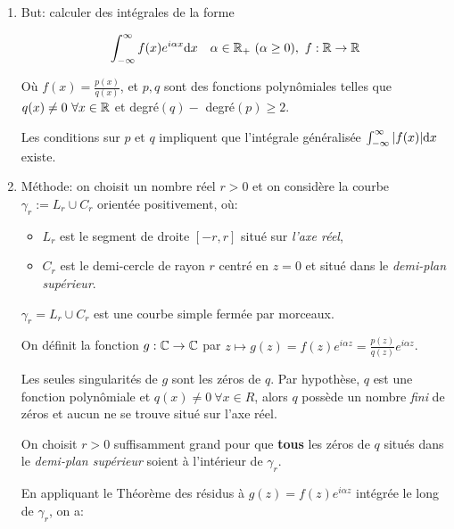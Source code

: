 \begin{enumerate}
\item But: calculer des intégrales de la forme

\[ \int_{-\infty}^\infty f(x) e^{i\alpha x} \mathrm{d}x \quad \alpha \in \mathbb{R}_+ \ (\alpha \geq 0),\ f: \mathbb{R} \rightarrow \mathbb{R} \]

Où $f(x) = \frac{p(x)}{q(x)}$, et $p, q$ sont des fonctions polynômiales telles que $q(x) \neq 0 \ \forall x \in \mathbb{R}$ et degré$(q) - $ degré$(p) \geq 2$.

\begin{remark}\hfill{}

    Les conditions sur $p$ et $q$ impliquent que l'intégrale généralisée $\int_{-\infty}^\infty |f(x)| \mathrm{d}x$ existe.
\end{remark}

\item Méthode: on choisit un nombre réel $r > 0$ et on considère la courbe $\gamma_r := L_r \cup C_r$ orientée positivement, où:

\begin{itemize}
    \item $L_r$ est le segment de droite $[-r,r]$ situé sur \textit{l'axe réel},
    \item $C_r$ est le demi-cercle de rayon $r$ centré en $z = 0$ et situé dans le \textit{demi-plan supérieur}.
\end{itemize}

$\gamma_r = L_r \cup C_r$ est une courbe simple fermée par morceaux.

On définit la fonction $g: \mathbb{C} \rightarrow \mathbb{C}$ par $z \mapsto g(z) = f(z) e^{i\alpha z} = \frac{p(z)}{q(z)} e^{i\alpha z}$.

\begin{constatation}
    Les seules singularités de $g$ sont les zéros de $q$.
    Par hypothèse, $q$ est une fonction polynômiale et $q(x) \neq 0 \ \forall x \in R$, alors $q$ possède un nombre \textit{fini} de zéros et aucun ne se trouve situé sur l'axe réel.
\end{constatation}

\begin{idea}
    On choisit $r > 0$ suffisamment grand pour que \textbf{tous} les zéros de $q$ situés dans le \textit{demi-plan supérieur} soient à l'intérieur de $\gamma_r$.
\end{idea}

En appliquant le Théorème des résidus à $g(z) = f(z) e^{i\alpha z}$ intégrée le long de $\gamma_r$, on a:


\end{enumerate}
